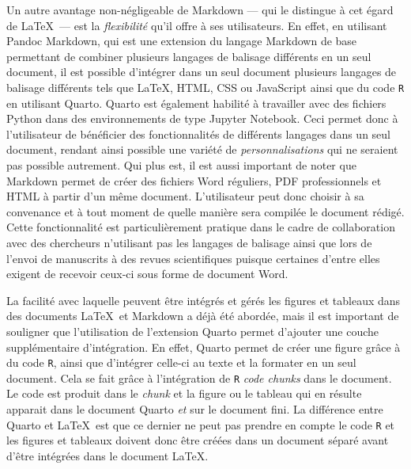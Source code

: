 \documentclass[
  letterpaper,
]{scrbook}
\begin{document}
Un autre avantage non-négligeable de Markdown --- qui le distingue à cet
égard de \LaTeX~--- est la \emph{flexibilité} qu'il offre à ses
utilisateurs. En effet, en utilisant Pandoc Markdown, qui est une
extension du langage Markdown de base permettant de combiner plusieurs
langages de balisage différents en un seul document, il est possible
d'intégrer dans un seul document plusieurs langages de balisage
différents tels que \LaTeX, HTML, CSS ou JavaScript ainsi que du code
\texttt{R} en utilisant Quarto. Quarto est également habilité à
travailler avec des fichiers Python dans des environnements de type
Jupyter Notebook. Ceci permet donc à l'utilisateur de bénéficier des
fonctionnalités de différents langages dans un seul document, rendant
ainsi possible une variété de \emph{personnalisations} qui ne seraient
pas possible autrement. Qui plus est, il est aussi important de noter
que Markdown permet de créer des fichiers Word réguliers, PDF
professionnels et HTML à partir d'un même document. L'utilisateur peut
donc choisir à sa convenance et à tout moment de quelle manière sera
compilée le document rédigé. Cette fonctionnalité est particulièrement
pratique dans le cadre de collaboration avec des chercheurs n'utilisant
pas les langages de balisage ainsi que lors de l'envoi de manuscrits à
des revues scientifiques puisque certaines d'entre elles exigent de
recevoir ceux-ci sous forme de document Word.

La facilité avec laquelle peuvent être intégrés et gérés les figures et
tableaux dans des documents \LaTeX~et Markdown a déjà été abordée, mais
il est important de souligner que l'utilisation de l'extension Quarto
permet d'ajouter une couche supplémentaire d'intégration. En effet,
Quarto permet de créer une figure grâce à du code \texttt{R}, ainsi que
d'intégrer celle-ci au texte et la formater en un seul document. Cela se
fait grâce à l'intégration de \texttt{R} \emph{code chunks} dans le
document. Le code est produit dans le \emph{chunk} et la figure ou le
tableau qui en résulte apparait dans le document Quarto \emph{et} sur le
document fini. La différence entre Quarto et \LaTeX~est que ce dernier
ne peut pas prendre en compte le code \texttt{R} et les figures et
tableaux doivent donc être créées dans un document séparé avant d'être
intégrées dans le document \LaTeX.
\end{document}
